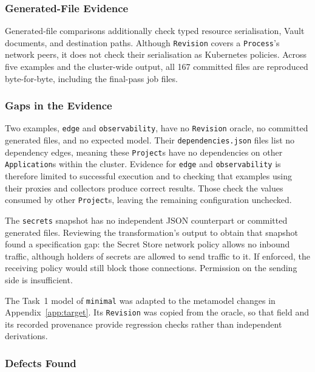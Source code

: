 \subsubsection{Generated-File Evidence}
\label{sec:treeevidence}

Generated-file comparisons additionally check typed resource serialisation,
Vault documents, and destination paths. Although \texttt{Revision} covers a
\texttt{Process}'s network peers, it does not check their serialisation as
Kubernetes policies. Across five examples and the cluster-wide output, all
167 committed files are reproduced byte-for-byte, including the final-pass
job files.

\subsubsection{Gaps in the Evidence}
\label{sec:thin}

Two examples, \texttt{edge} and \texttt{observability}, have no
\texttt{Revision} oracle, no committed generated files, and no expected model.
Their \texttt{dependencies.json} files list no dependency edges, meaning these \texttt{Project}s have no dependencies on other \texttt{Application}s within the cluster. Evidence for \texttt{edge} and \texttt{observability} is
therefore limited to successful execution and to checking that examples using their proxies and collectors produce correct results. Those check the values consumed by other
\texttt{Project}s, leaving the remaining configuration unchecked.

The \texttt{secrets} snapshot has no independent JSON counterpart or
committed generated files. Reviewing the transformation's output to obtain
that snapshot found a specification gap: the Secret Store
network policy allows no inbound traffic, although holders of secrets are
allowed to send traffic to it. If enforced, the receiving policy would
still block those connections. Permission on the sending side is insufficient.

The Task~1 model of \texttt{minimal} was adapted to the metamodel changes in
Appendix~\ref{app:target}. Its \texttt{Revision} was copied from the oracle,
so that field and its recorded provenance provide regression checks rather
than independent derivations.

\subsubsection{Defects Found}
\label{sec:defects}

